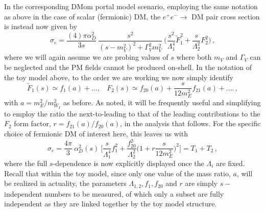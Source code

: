 \documentclass[14pt]{article}
\def\to{\rightarrow}
\begin{document}
{In the corresponding DMom portal model scenario, employing the same notation as above in the case of scalar (fermionic) DM, the $e^+e^ -\to$ DM pair cross section is instead now given by
%
\begin{equation}
\sigma_e=\frac{(4)\pi \alpha_D^2}{3s}~\frac{s^2}{(s-m_V^2)^2+\Gamma_V^2m_V^2}~\Big(\frac{s^2}{\Lambda_1^4}\tilde F_1^2+\frac{s}{\Lambda_2^2}F_2^2\Big)\,,  
\end{equation}
%
where we will again assume we are probing values of $s$ where both $m_V$ and $\Gamma_V$ can be neglected and the PM fields cannot be produced on-shell. 
In the notation of the toy model above, to the order we are working we now simply identify
%
\begin{equation}
\tilde F_1(s)\simeq f_1(a)+...,~~~~F_2(s) \simeq f_{20}(a)+\frac{s}{12m_E^2}f_{21}(a)+....\,,  
\end{equation}
%
with $a=m_E^2/m_{W_I}^2$ as before. As noted, it will be frequently useful and simplifying to employ the ratio the next-to-leading to that of the leading contributions to the $F_2$ form factor, 
$r=f_{21}(a)/f_{20}(a)$, in the analysis that follows. For the specific choice of fermionic DM of interest here, this leaves us with
%
\begin{equation}
\sigma_e=\frac{4\pi}{3}~\alpha_D^2(s)~\Bigg[\frac{s}{\Lambda_1^4}f_1^2+\frac{f_{20}^2}{\Lambda_2^2}\Big(1+r\frac{s}{12m_E^2}\Big)^2\Bigg]= T_1+T_2\,,  
\end{equation}
%
where the full $s$-dependence is now explicitly displayed once the $\Lambda_i$ are fixed. Recall that within the toy model, since only one value of the mass ratio, $a$, will be realized in actuality, the 
parameters $\Lambda_{1,2}, f_1,f_{20}$ and $r$ are simply $s-$independent numbers to be measured, of which only a subset are fully independent as they are linked together by the toy model 
structure.  

}
\end{document}

